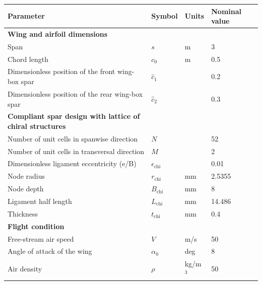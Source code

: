     \begin{table}[!htpb]
    \centering
    \begin{tabular}{|l|lll|}
    \hline
    \textbf{Parameter} & \multicolumn{1}{l|}{\textbf{Symbol}} & \multicolumn{1}{l|}{\textbf{Units}} & \textbf{Nominal value} \\ \hline \hline
    {\textbf{Wing and airfoil dimensions}} &  &  &  \\ \hline
    Span & \multicolumn{1}{l|}{$s$} & \multicolumn{1}{l|}{m} & 3 \\ \hline
    Chord length & \multicolumn{1}{l|}{$c_0$} & \multicolumn{1}{l|}{m} & 0.5 \\ \hline
    Dimensionless position of the front wing-box spar & \multicolumn{1}{l|}{$\hat{c}_1$} & \multicolumn{1}{l|}{} & 0.2 \\ \hline
    Dimensionless position of the rear wing-box spar & \multicolumn{1}{l|}{$\hat{c}_2$} & \multicolumn{1}{l|}{} & 0.3 \\ \hline \hline
    {\textbf{Compliant spar design with lattice of chiral structures}} &  &  &  \\ \hline
    Number of unit cells in spanwise direction & \multicolumn{1}{l|}{$N$} & \multicolumn{1}{l|}{} & 52 \\ \hline
    Number of unit cells in transversal direction & \multicolumn{1}{l|}{$M$} & \multicolumn{1}{l|}{} & 2 \\ \hline
    Dimensionless ligament eccentricity (e/B) & \multicolumn{1}{l|}{$\epsilon_{\mathrm{chi}}$} & \multicolumn{1}{l|}{} & 0.01 \\ \hline
    Node radius & \multicolumn{1}{l|}{$r_{\mathrm{chi}}$} & \multicolumn{1}{l|}{mm} & 2.5355 \\ \hline
    Node depth & \multicolumn{1}{l|}{$B_{\mathrm{chi}}$} & \multicolumn{1}{l|}{mm} & 8 \\ \hline
    Ligament half length & \multicolumn{1}{l|}{$L_{\mathrm{chi}}$} & \multicolumn{1}{l|}{mm} & 14.486 \\ \hline
    Thickness & \multicolumn{1}{l|}{$t_{\mathrm{chi}}$} & \multicolumn{1}{l|}{mm} & 0.4 \\ \hline \hline
    {\textbf{Flight condition}} &  &  &  \\ \hline
    Free-stream air speed & \multicolumn{1}{l|}{$V$} & \multicolumn{1}{l|}{m/s} & 50 \\ \hline
    Angle of attack of the wing & \multicolumn{1}{l|}{$\alpha_0$} & \multicolumn{1}{l|}{deg} & 8 \\ \hline
    Air density & \multicolumn{1}{l|}{$\rho$} & \multicolumn{1}{l|}{kg/m$^3$} & 50 \\ \hline

\end{tabular}
\end{table}
